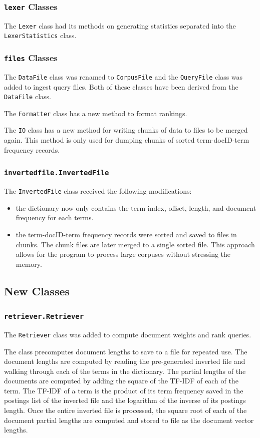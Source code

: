 \documentclass[11pt]{article}
\begin{document}
\subsubsection{\texttt{lexer} Classes}
The \texttt{Lexer} class had its methods on generating statistics separated into the \texttt{LexerStatistics} class.

\subsubsection{\texttt{files} Classes}
The \texttt{DataFile} class was renamed to \texttt{CorpusFile} and the \texttt{QueryFile} class was added to ingest query files. Both of these classes have been derived from the \texttt{DataFile} class.

The \texttt{Formatter} class has a new method to format rankings.

The \texttt{IO} class has a new method for writing chunks of data to files to be merged again. This method is only used for dumping chunks of sorted term-docID-term frequency records.

\subsubsection{\texttt{invertedfile.InvertedFile}}
The \texttt{InvertedFile} class received the following modifications:
\begin{itemize}
    \item the dictionary now only contains the term index, offset, length, and document frequency for each terms.
    \item the term-docID-term frequency records were sorted and saved to files in chunks. The chunk files are later merged to a single sorted file. This approach allows for the program to process  large corpuses without stressing the memory.
\end{itemize}

\subsection{New Classes}

\subsubsection{\texttt{retriever.Retriever}}
The \texttt{Retriever} class was added to compute document weights and rank queries.

The class precomputes document lengths to save to a file for repeated use. The document lengths are computed by reading the pre-generated inverted file and walking through each of the terms in the dictionary. The partial lengths of the documents are computed by adding the square of the TF-IDF of each of the term. The TF-IDF of a term is the product of its term frequency saved in the postings list of the inverted file and the logarithm of the inverse of its postings length. Once the entire inverted file is processed, the square root of each of the document partial lengths are computed and stored to file as the document vector lengths.
\end{document}
